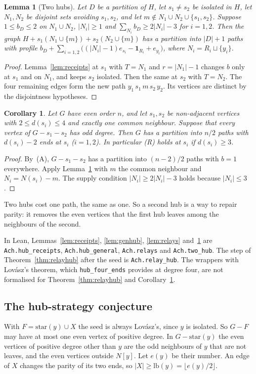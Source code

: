 \documentclass[11pt]{amsart}
\newtheorem{lemma}[theorem]{Lemma}
\newtheorem{corollary}[theorem]{Corollary}
\theoremstyle{definition}
\begin{document}
\begin{lemma}[Two hubs]\label{lem:twohub}
Let $D$ be a partition of $H$, let $s_1\ne s_2$ be isolated in $H$, let $N_1,N_2$ be disjoint sets
avoiding $s_1,s_2$, and let $m\notin N_1\cup N_2\cup\{s_1,s_2\}$. Suppose $1\le b_D\le2$ on
$N_1\cup N_2$, $|N_i|\ge1$ and $\sum_{N_i}b_D\ge2|N_i|-3$ for $i=1,2$. Then the graph
$H+s_1(N_1\cup\{m\})+s_2(N_2\cup\{m\})$ has a partition into $|D|+1$ paths with profile
$b_D+\sum_{i=1,2}\bigl((|N_i|-1)e_{s_i}-\mathbf 1_{R_i}+e_{y_i}\bigr)$, where
$N_i=R_i\sqcup\{y_i\}$.
\end{lemma}
\begin{proof}
Lemma~\ref{lem:receipts} at $s_1$ with $T=N_1$ and $r=|N_1|-1$ changes $b$ only at $s_1$ and on
$N_1$, and keeps $s_2$ isolated. Then the same at $s_2$ with $T=N_2$. The four remaining edges
form the new path $y_1\,s_1\,m\,s_2\,y_2$. Its vertices are distinct by the disjointness
hypotheses.
\end{proof}

\begin{corollary}\label{cor:twohub}
Let $G$ have even order $n$, and let $s_1,s_2$ be non-adjacent vertices with $2\le d(s_i)\le4$ and
exactly one common neighbour. Suppose that every vertex of $G-s_1-s_2$ has odd degree. Then $G$
has a partition into $n/2$ paths with $d(s_i)-2$ ends at $s_i$ ($i=1,2$). In particular (R) holds
at $s_i$ if $d(s_i)\ge3$.
\end{corollary}
\begin{proof}
By~(A), $G-s_1-s_2$ has a partition into $(n-2)/2$ paths with $b=1$ everywhere. Apply
Lemma~\ref{lem:twohub} with $m$ the common neighbour and $N_i=N(s_i)-m$. The supply condition
$|N_i|\ge2|N_i|-3$ holds because $|N_i|\le3$.
\end{proof}
Two hubs cost one path, the same as one. So a second hub is a way to repair parity: it removes the
even vertices that the first hub leaves among the neighbours of the second.

In Lean, Lemmas~\ref{lem:receipts}, \ref{lem:genhub}, \ref{lem:relays} and~\ref{lem:twohub} are
\texttt{Ach.hub\_receipts}, \texttt{Ach.hub\_general}, \texttt{Ach.relays} and
\texttt{Ach.two\_hub}. The step of Theorem~\ref{thm:relayhub} after the seed is
\texttt{Ach.relay\_hub}. The wrappers with Lov\'asz's theorem, which \texttt{hub\_four\_ends} provides
at degree four, are not formalised for Theorem~\ref{thm:relayhub} and Corollary~\ref{cor:twohub}.

\subsection*{The hub-strategy conjecture}
With $F=\mathrm{star}(y)\cup X$ the seed is always Lov\'asz's, since $y$ is isolated. So $G-F$ may
have at most one even vertex of positive degree. In $G-\mathrm{star}(y)$ the even vertices of
positive degree other than $y$ are the odd neighbours of $y$ that are not leaves, and the even
vertices outside $N[y]$. Let $e(y)$ be their number. An edge of $X$ changes the parity of its two
ends, so $|X|\ge\mathrm{lb}(y)=\lfloor e(y)/2\rfloor$.
\end{document}
